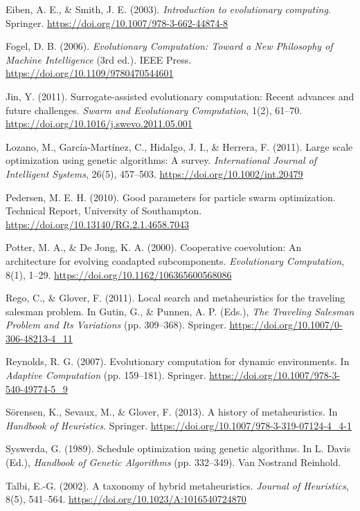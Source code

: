 \documentclass[conference]{IEEEtran}
\begin{document}
\begin{thebibliography}{99}
Eiben, A. E., \& Smith, J. E. (2003). \textit{Introduction to evolutionary computing}. Springer. \url{https://doi.org/10.1007/978-3-662-44874-8}

Fogel, D. B. (2006). \textit{Evolutionary Computation: Toward a New Philosophy of Machine Intelligence} (3rd ed.). IEEE Press. \url{https://doi.org/10.1109/9780470544601}

Jin, Y. (2011). Surrogate-assisted evolutionary computation: Recent advances and future challenges. \textit{Swarm and Evolutionary Computation}, 1(2), 61–70. \url{https://doi.org/10.1016/j.swevo.2011.05.001}

Lozano, M., García-Martínez, C., Hidalgo, J. I., \& Herrera, F. (2011). Large scale optimization using genetic algorithms: A survey. \textit{International Journal of Intelligent Systems}, 26(5), 457–503. \url{https://doi.org/10.1002/int.20479}

Pedersen, M. E. H. (2010). Good parameters for particle swarm optimization. Technical Report, University of Southampton. \url{https://doi.org/10.13140/RG.2.1.4658.7043}

Potter, M. A., \& De Jong, K. A. (2000). Cooperative coevolution: An architecture for evolving coadapted subcomponents. \textit{Evolutionary Computation}, 8(1), 1–29. \url{https://doi.org/10.1162/106365600568086}

Rego, C., \& Glover, F. (2011). Local search and metaheuristics for the traveling salesman problem. In Gutin, G., \& Punnen, A. P. (Eds.), \textit{The Traveling Salesman Problem and Its Variations} (pp. 309–368). Springer. \url{https://doi.org/10.1007/0-306-48213-4_11}

Reynolds, R. G. (2007). Evolutionary computation for dynamic environments. In \textit{Adaptive Computation} (pp. 159–181). Springer. \url{https://doi.org/10.1007/978-3-540-49774-5_9}

Sörensen, K., Sevaux, M., \& Glover, F. (2013). A history of metaheuristics. In \textit{Handbook of Heuristics}. Springer. \url{https://doi.org/10.1007/978-3-319-07124-4_4-1}

Syswerda, G. (1989). Schedule optimization using genetic algorithms. In L. Davis (Ed.), \textit{Handbook of Genetic Algorithms} (pp. 332–349). Van Nostrand Reinhold.

Talbi, E.-G. (2002). A taxonomy of hybrid metaheuristics. \textit{Journal of Heuristics}, 8(5), 541–564. \url{https://doi.org/10.1023/A:1016540724870}


\end{thebibliography}
\end{document}
